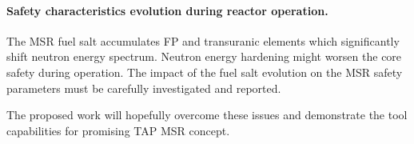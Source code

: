 \paragraph{Safety characteristics evolution during reactor operation.} The 
\gls{MSR} fuel salt  accumulates \gls{FP} and transuranic elements which 
significantly shift neutron energy spectrum. Neutron energy hardening might 
worsen the core safety during operation. The impact of the fuel salt evolution 
on the \gls{MSR} safety parameters must be carefully investigated and reported.

The proposed work will hopefully overcome these issues and demonstrate the 
tool capabilities for promising \gls{TAP} \gls{MSR} concept.